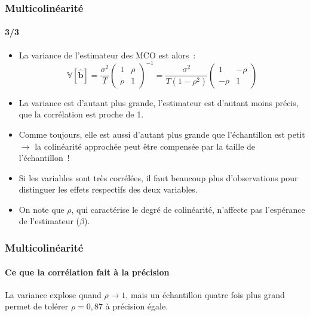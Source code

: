 \documentclass[10pt]{beamer}
\begin{document}
\begin{frame}
  \frametitle{Multicolinéarité}
  \framesubtitle{3/3}

  \begin{itemize}


  \item La variance de l'estimateur des MCO est alors~:
    \[
      \mathbb V[\hat{\mathbf{b}}] = \frac{\sigma^2}{T}
      \begin{pmatrix}
        1 & \rho\\
        \rho & 1
      \end{pmatrix}^{-1}
      = \frac{\sigma^2}{T(1-\rho^2)}
      \begin{pmatrix}
        1 & -\rho\\
        -\rho & 1
      \end{pmatrix}
    \]

    \medskip

  \item La variance est d'autant plus grande, l'estimateur est d'autant moins précis, que la corrélation est proche de 1.\newline

  \item Comme toujours, elle est aussi d'autant plus grande que l'échantillon est petit $\rightarrow$ la colinéarité approchée peut être compensée par la taille de l'échantillon~!\newline

  \item Si les variables sont très corrélées, il faut beaucoup plus d'observations pour distinguer les effets respectifs des deux variables.\newline

  \item On note que $\rho$, qui caractérise le degré de colinéarité, n'affecte pas l'espérance de l'estimateur ($\beta$).

  \end{itemize}

\end{frame}


\begin{frame}[c]
  \frametitle{Multicolinéarité}
  \framesubtitle{Ce que la corrélation fait à la précision}

  \begin{center}
    \scalebox{.72}{}
  \end{center}

  \medskip

  {\small La variance explose quand $\rho\rightarrow 1$, mais un échantillon quatre
    fois plus grand permet de tolérer $\rho = 0{,}87$ à précision égale.}

\end{frame}
\end{document}
